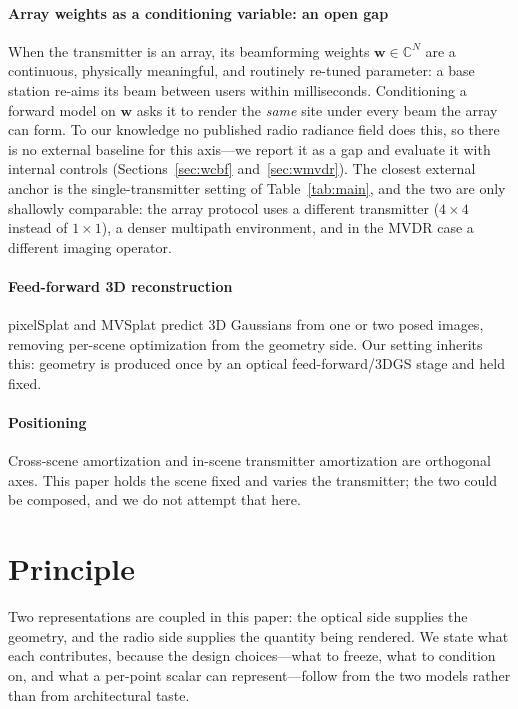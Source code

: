 \documentclass[conference]{IEEEtran}
\begin{document}
\paragraph{Array weights as a conditioning variable: an open gap}
When the transmitter is an array, its beamforming weights
$\mathbf{w}\in\mathbb{C}^{N}$ are a continuous, physically meaningful, and
routinely re-tuned parameter: a base station re-aims its beam between users
within milliseconds. Conditioning a forward model on $\mathbf{w}$ asks it to
render the \emph{same} site under every beam the array can form. To our
knowledge no published radio radiance field does this, so there is no external
baseline for this axis---we report it as a gap and evaluate it with internal
controls (Sections~\ref{sec:wcbf} and~\ref{sec:wmvdr}). The closest external
anchor is the single-transmitter setting of Table~\ref{tab:main}, and the two
are only shallowly comparable: the array protocol uses a different transmitter
($4\times4$ instead of $1\times1$), a denser multipath environment, and in the
MVDR case a different imaging operator.

\paragraph{Feed-forward 3D reconstruction}
pixelSplat \cite{pixelsplat} and MVSplat \cite{mvsplat} predict 3D Gaussians
from one or two posed images, removing per-scene optimization from the
geometry side. Our setting inherits this: geometry is produced once by an
optical feed-forward/3DGS stage and held fixed.

\paragraph{Positioning}
Cross-scene amortization \cite{corf} and in-scene transmitter amortization are
orthogonal axes. This paper holds the scene fixed and varies the transmitter;
the two could be composed, and we do not attempt that here.

\section{Principle}
\label{sec:principle}

Two representations are coupled in this paper: the optical side supplies the
geometry, and the radio side supplies the quantity being rendered. We state
what each contributes, because the design choices---what to freeze, what to
condition on, and what a per-point scalar can represent---follow from the two
models rather than from architectural taste.
\end{document}
